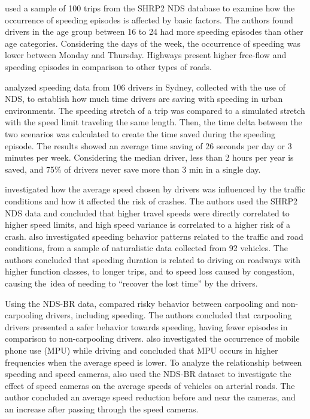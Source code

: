 \textcite{Richard2020} used a sample of 100 trips from the SHRP2 NDS database to examine how the occurrence of speeding episodes is affected by basic factors. The authors found drivers in the age group between 16 to 24 had more speeding episodes than other age categories. Considering the days of the week, the occurrence of speeding was lower between Monday and Thursday. Highways present higher free-flow and speeding episodes in comparison to other types of roads. 

\textcite{Ellison2015} analyzed speeding data from 106 drivers in Sydney, collected with the use of NDS, to establish how much time drivers are saving with speeding in urban environments. The speeding stretch of a trip was compared to a simulated stretch with the speed limit traveling the same length. Then, the time delta between the two scenarios was calculated to create the time saved during the speeding episode. The results showed an average time saving of 26 seconds per day or 3 minutes per week. Considering the median driver, less than 2 hours per year is saved, and 75\% of drivers never save more than 3 min in a single day. 

\textcite{Hamzeie2017} investigated how the average speed chosen by drivers was influenced by the traffic conditions and how it affected the risk of crashes. The authors used the SHRP2 NDS data and concluded that higher travel speeds were directly correlated to higher speed limits, and high speed variance is correlated to a higher risk of a crash. \textcite{Kong2020} also investigated speeding behavior patterns related to the traffic and road conditions, from a sample of naturalistic data collected from 92 vehicles. The authors concluded that speeding duration is related to driving on roadways with higher function classes, to longer trips, and to speed loss caused by congestion, causing the\ idea of needing to ``recover the lost time'' by the drivers.

Using the NDS-BR data, \textcite{Bastos2021} compared risky behavior between carpooling and non-carpooling drivers, including speeding. The authors concluded that carpooling drivers presented a safer behavior towards speeding, having fewer episodes in comparison to non-carpooling drivers. \textcite{Bastos2020a} also investigated the occurrence of mobile phone use (MPU) while driving and concluded that MPU occurs in higher frequencies when the average speed is lower. To analyze the relationship between speeding and speed cameras, \textcite{Amancio2021} also used the NDS-BR dataset to investigate the effect of speed cameras on the average speeds of vehicles on arterial roads. The author concluded an average speed reduction before and near the cameras, and an increase after passing through the speed cameras. 

